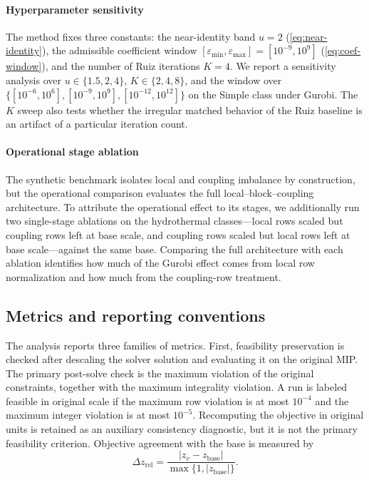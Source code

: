 \documentclass[AMA,Times1COL]{WileyNJDv5} %
\providecommand{\DIFadd}[1]{{\protect\color{blue} \sf #1}} %
\providecommand{\DIFaddend}{} %
\begin{document}
\paragraph{\DIFadd{Hyperparameter sensitivity}}
\DIFadd{The method fixes three constants: the near-identity band $u=2$ (\cref{eq:near-identity}),
the admissible coefficient window $[\varepsilon_{\min},\varepsilon_{\max}]=[10^{-9},10^{9}]$
(\cref{eq:coef-window}), and the number of Ruiz iterations $K=4$. We report a sensitivity
analysis over $u\in\{1.5,2,4\}$, $K\in\{2,4,8\}$, and the window over
$\{[10^{-6},10^{6}],[10^{-9},10^{9}],[10^{-12},10^{12}]\}$ on the Simple class under Gurobi.
The $K$ sweep also tests whether the irregular matched behavior of the Ruiz baseline is an
artifact of a particular iteration count.
}

\paragraph{\DIFadd{Operational stage ablation}}
\DIFadd{The synthetic benchmark isolates local and coupling imbalance by construction, but the
operational comparison evaluates the full local--block--coupling architecture. To attribute
the operational effect to its stages, we additionally run two single-stage ablations on the
hydrothermal classes---local rows scaled but coupling rows left at base scale, and coupling
rows scaled but local rows left at base scale---against the same base. Comparing the full
architecture with each ablation identifies how much of the Gurobi effect comes from local
row normalization and how much from the coupling-row treatment.
}

\DIFaddend \subsection{Metrics and reporting conventions}
\label{subsec:metrics}

The analysis reports three families of metrics. First, feasibility preservation is checked
after descaling the solver solution and evaluating it on the original MIP. The primary
post-solve check is the maximum violation of the original constraints, together with the
maximum integrality violation. A run is labeled feasible in original scale if the maximum
row violation is at most $10^{-4}$ and the maximum integer violation is at most
$10^{-5}$. Recomputing the objective in original units is retained as an auxiliary
consistency diagnostic, but it is not the primary feasibility criterion. Objective agreement
with the base is measured by
\begin{equation}
\Delta z_{\mathrm{rel}}=
\frac{|z_v-z_{\mathrm{base}}|}{\max\{1,|z_{\mathrm{base}}|\}}.
\label{eq:relative-objective-deviation}
\end{equation}
\end{document}
